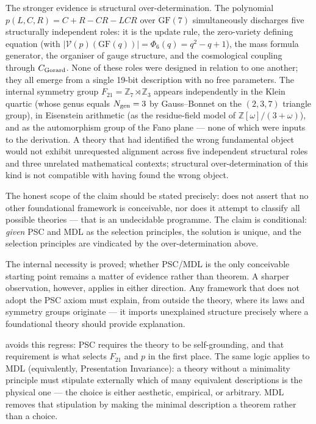 \documentclass[11pt]{article}
\newcommand{\GTE}{\text{GTE}}
\begin{document}
The stronger evidence is structural over-determination.  The polynomial
$p(L,C,R)=C+R-CR-LCR$ over $\mathrm{GF}(7)$ simultaneously discharges five
structurally independent roles: it is the update rule, the zero-variety defining
equation (with $|\mathcal{V}(p)(\mathrm{GF}(q))|=\Phi_6(q)=q^2-q+1$), the mass
formula generator, the organiser of gauge structure, and the cosmological coupling
through $C_{\rm Gorard}$.  None of these roles were designed in relation to one another;
they all emerge from a single 19-bit description with no free parameters.  The internal
symmetry group $F_{21}=\mathbb{Z}_7\rtimes\mathbb{Z}_3$ appears independently in the
Klein quartic (whose genus equals $N_{\rm gen}=3$ by Gauss--Bonnet on the $(2,3,7)$
triangle group), in Eisenstein arithmetic (as the residue-field model of
$\mathbb{Z}[\omega]/(3+\omega)$), and as the automorphism group of the Fano plane ---
none of which were inputs to the derivation.  A theory that had identified the wrong
fundamental object would not exhibit unrequested alignment across five independent
structural roles and three unrelated mathematical contexts; structural
over-determination of this kind is not compatible with having found the wrong
object.

The honest scope of the claim should be stated precisely: \GTE{} does not assert that
no other foundational framework is conceivable, nor does it attempt to classify all
possible theories --- that is an undecidable programme.  The claim is conditional:
\emph{given} PSC and MDL as the selection principles, the solution is unique, and the
selection principles are vindicated by the over-determination above.

The internal necessity is proved; whether PSC/MDL is the only conceivable starting
point remains a matter of evidence rather than theorem.  A sharper observation,
however, applies in either direction.  Any framework that does not adopt the PSC
axiom must explain, from outside the theory, where its laws and symmetry groups
originate --- it imports unexplained structure precisely where a foundational theory
should provide explanation.

\GTE{} avoids this regress: PSC requires the theory to
be self-grounding, and that requirement is what selects $F_{21}$ and $p$ in the first
place.  The same logic applies to MDL (equivalently, Presentation Invariance): a
theory without a minimality principle must stipulate externally which of many
equivalent descriptions is the physical one --- the choice is either aesthetic,
empirical, or arbitrary.  MDL removes that stipulation by making the minimal
description a theorem rather than a choice.
\end{document}
